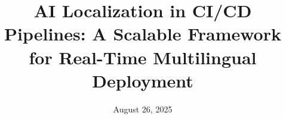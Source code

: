 \documentclass[11pt]{article}
\title{AI Localization in CI/CD Pipelines: A Scalable Framework for Real-Time Multilingual Deployment}
\date{August 26, 2025}
\begin{document}
\maketitle










\ifx\venue\emnlp
  
\else
  
\fi

\end{document}
